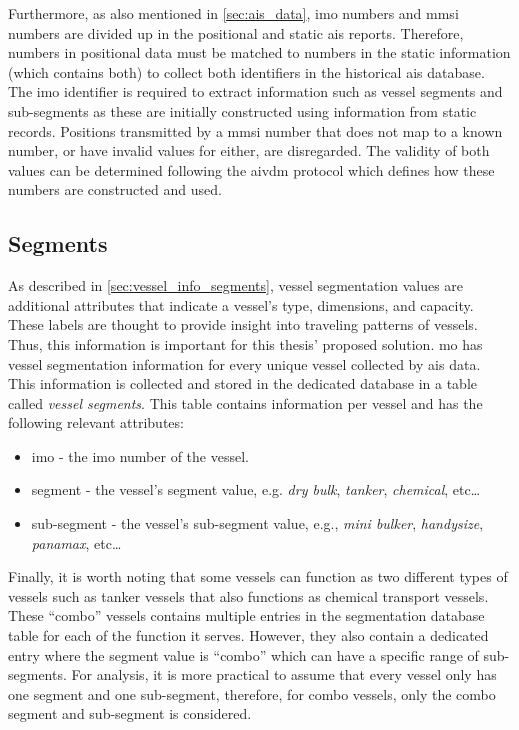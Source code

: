 Furthermore, as also mentioned in \cref{sec:ais_data}, \acrshort{imo} numbers and \acrshort{mmsi} numbers are divided up in the positional and static \acrshort{ais} reports. Therefore,  numbers in positional data must be matched to  numbers in the static information (which contains both) to collect both identifiers in the historical \acrshort{ais} database. The \acrshort{imo} identifier is required to extract information such as vessel segments and sub-segments as these are initially constructed using information from static records. Positions transmitted by a \acrshort{mmsi} number that does not map to a known  number, or have invalid values for either, are disregarded. The validity of both values can be determined following the \gls{aivdm} protocol which defines how these numbers are constructed and used.

\subsection{Segments}

As described in \cref{sec:vessel_info_segments}, vessel segmentation values are additional attributes that indicate a vessel's type, dimensions, and capacity. These labels are thought to provide insight into traveling patterns of vessels. Thus, this information is important for this thesis' proposed solution. \acrshort{mo} has vessel segmentation information for every unique vessel collected by \acrshort{ais} data. This information is collected and stored in the dedicated database in a table called \textit{vessel segments}. This table contains information per vessel and has the following relevant attributes:

\begin{itemize}
    \item imo - the \acrshort{imo} number of the vessel.
    \item segment - the vessel's segment value, e.g. \textit{dry bulk}, \textit{tanker}, \textit{chemical}, etc\ldots
    \item sub-segment - the vessel's sub-segment value, e.g., \textit{mini bulker}, \textit{handysize}, \textit{panamax}, etc\ldots
\end{itemize}

Finally, it is worth noting that some vessels can function as two different types of vessels such as tanker vessels that also functions as chemical transport vessels. These ``combo'' vessels contains multiple entries in the segmentation database table for each of the function it serves. However, they also contain a dedicated entry where the segment value is ``combo'' which can have a specific range of sub-segments. For analysis, it is more practical to assume that every vessel only has one segment and one sub-segment, therefore, for combo vessels, only the combo segment and sub-segment is considered.

